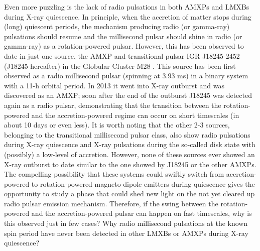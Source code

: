 \documentclass[graybox]{svmult}
\begin{document}
Even more puzzling is the lack of radio pulsations in both AMXPs and LMXBs during X-ray quiescence. In principle, when the accretion of matter stops during (long) quiescent periods, the mechanism producing radio (or gamma-ray) pulsations should resume and the millisecond pulsar should shine in radio (or gamma-ray) as a rotation-powered pulsar. However, this has been observed to date in just one source, the AMXP and transitional pulsar IGR J18245-2452 (J18245 hereafter) in the Globular Cluster M28 \cite{Papitto2013b}. This source has been first observed as a radio millisecond pulsar (spinning at 3.93 ms) in a binary system with a 11-h orbital period. In 2013 it went into X-ray outburst and was discovered as an AMXP; soon after the end of the outburst J18245 was detected again as a radio pulsar, demonstrating that the transition between the rotation-powered and the accretion-powered regime can occur on short timescales (in about 10 days or even less). It is worth noting that the other 2-3 sources, belonging to the transitional millisecond pulsar class, also show radio pulsations during X-ray quiescence and X-ray pulsations during the so-called disk state with (possibly) a low-level of accretion. However, none of these sources ever showed an X-ray outburst to date similar to the one showed by J18245 or the other AMXPs. The compelling possibility that these systems could swiftly switch from accretion-powered to rotation-powered magneto-dipole emitters during quiescence gives the opportunity to study a phase that could shed new light on the not yet cleared up radio pulsar emission mechanism. Therefore, if the swing between the rotation-powered and the accretion-powered pulsar can happen on fast timescales, why is this  observed just in few cases? Why radio millisecond pulsations at the known spin period have never been detected in other LMXBs or AMXPs during X-ray quiescence? 
\end{document}
